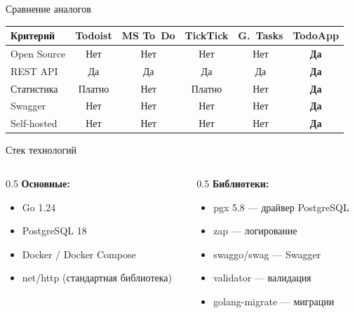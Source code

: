 \documentclass[aspectratio=169, 14pt]{beamer}
\begin{document}
\begin{frame}{Сравнение аналогов}

\centering
\footnotesize
\begin{tabular}{|l|c|c|c|c|c|}
\hline
\textbf{Критерий} & \textbf{Todoist} & \textbf{MS To~Do} & \textbf{TickTick} & \textbf{G.~Tasks} & \textbf{TodoApp} \\
\hline
Open Source & Нет & Нет & Нет & Нет & \textbf{Да} \\
\hline
REST API & Да & Да & Да & Да & \textbf{Да} \\
\hline
Статистика & Платно & Нет & Платно & Нет & \textbf{Да} \\
\hline
Swagger & Нет & Нет & Нет & Нет & \textbf{Да} \\
\hline
Self-hosted & Нет & Нет & Нет & Нет & \textbf{Да} \\
\hline
\end{tabular}

\end{frame}

\begin{frame}{Стек технологий}

\begin{columns}[T]
\begin{column}{0.5\textwidth}
\textbf{Основные:}
\begin{itemize}
  \item Go 1.24
  \item PostgreSQL 18
  \item Docker / Docker Compose
  \item net/http (стандартная библиотека)
\end{itemize}
\end{column}
\begin{column}{0.5\textwidth}
\textbf{Библиотеки:}
\begin{itemize}
  \item pgx 5.8 --- драйвер PostgreSQL
  \item zap --- логирование
  \item swaggo/swag --- Swagger
  \item validator --- валидация
  \item golang-migrate --- миграции
\end{itemize}
\end{column}
\end{columns}

\end{frame}
\end{document}
